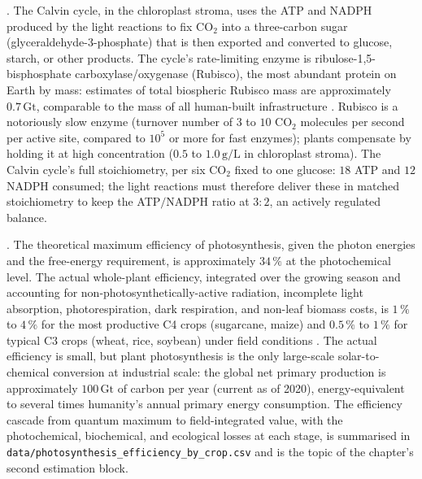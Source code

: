 

. The Calvin cycle, in the
chloroplast stroma, uses the ATP and NADPH produced by the light
reactions to fix CO$_2$ into a three-carbon sugar (glyceraldehyde-3-phosphate)
that is then exported and converted to glucose, starch, or other
products. The cycle's rate-limiting enzyme is
ribulose-1,5-bisphosphate carboxylase/oxygenase (Rubisco), the most
abundant protein on Earth by mass: estimates of total biospheric
Rubisco mass are approximately $0.7\,\text{Gt}$, comparable to the
mass of all human-built infrastructure \cite[ch.~20]{text:lehninger-biochemistry}.
Rubisco is a notoriously slow enzyme (turnover number of $3$ to $10$
CO$_2$ molecules per second per active site, compared to $10^5$ or
more for fast enzymes); plants compensate by holding it at high
concentration ($0.5$ to $1.0\,\text{g}/\text{L}$ in chloroplast
stroma). The Calvin cycle's full stoichiometry, per six CO$_2$ fixed
to one glucose: $18$ ATP and $12$ NADPH consumed; the light reactions
must therefore deliver these in matched stoichiometry to keep the
ATP$/$NADPH ratio at $3:2$, an actively regulated balance.

. The theoretical maximum efficiency of
photosynthesis, given the photon energies and the free-energy
requirement, is approximately $34\,\%$ at the photochemical level.
The actual whole-plant efficiency, integrated over the growing
season and accounting for non-photosynthetically-active radiation,
incomplete light absorption, photorespiration, dark respiration, and
non-leaf biomass costs, is $1\,\%$ to $4\,\%$ for the most
productive C4 crops (sugarcane, maize) and $0.5\,\%$ to $1\,\%$ for
typical C3 crops (wheat, rice, soybean) under field conditions
\cite[ch.~20]{text:lehninger-biochemistry,paper:v6c02-zhu-photosynthesis-2010}.
The actual efficiency is small, but plant photosynthesis is the only
large-scale solar-to-chemical conversion at industrial scale: the
global net primary production is approximately $100\,\text{Gt}$ of
carbon per year (current as of 2020), energy-equivalent to several
times humanity's annual primary energy consumption. The efficiency
cascade from quantum maximum to field-integrated value, with the
photochemical, biochemical, and ecological losses at each stage, is
summarised in \texttt{data/photosynthesis\_efficiency\_by\_crop.csv}
and is the topic of the chapter's second estimation block.

